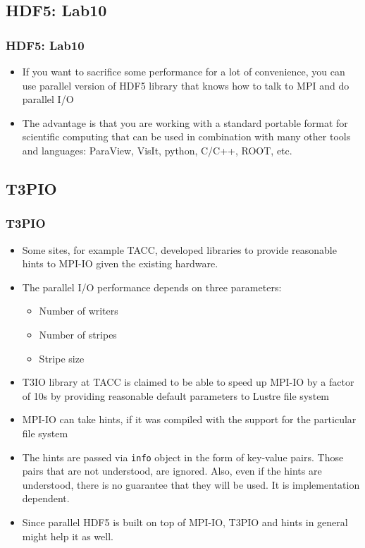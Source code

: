 \documentclass{beamer}
\begin{document}
\subsection{HDF5: Lab10}
\begin{frame}[fragile]
  \frametitle{HDF5: Lab10}
\begin{itemize}
\item If you want to sacrifice some performance for a lot of convenience, you can use parallel version of HDF5 library that knows how to talk to MPI and do parallel I/O
\item The advantage is that you are working with a standard portable format for scientific computing that can be used in combination with many other tools and languages: ParaView, VisIt, python, C/C++, ROOT, etc.
\end{itemize}
\end{frame}

\subsection{T3PIO}
\begin{frame}[fragile]
  \frametitle{T3PIO}
\begin{itemize}
\item Some sites, for example TACC, developed libraries to provide reasonable hints to MPI-IO given the existing hardware.
\item The parallel I/O performance depends on three parameters:
\begin{itemize}
\item Number of writers
\item Number of stripes
\item Stripe size
\end{itemize}
\item T3IO library at TACC is claimed to be able to speed up MPI-IO by a factor of 10s by providing reasonable default parameters to Lustre file system
\item MPI-IO can take hints, if it was compiled with the support for the particular file system
\item The hints are passed via {\color{mycolorcode}\verb|info|} object in the form of key-value pairs. Those pairs that are not understood, are ignored. Also, even if the hints are understood, there is no guarantee that they will be used. 
It is implementation dependent.
\item Since parallel HDF5 is built on top of MPI-IO, T3PIO and hints in general might help it as well.
\end{itemize}
\end{frame}
\end{document}
